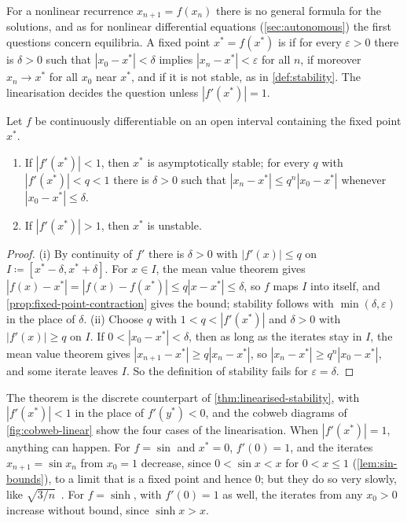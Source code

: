 For a nonlinear recurrence $x_{n+1}=f(x_n)$ there is no general formula for the solutions, and as for nonlinear differential equations (\cref{sec:autonomous}) the first questions concern equilibria. A fixed point $x^*=f(x^*)$ is  if for every $\varepsilon>0$ there is $\delta>0$ such that $|x_0-x^*|<\delta$ implies $|x_n-x^*|<\varepsilon$ for all $n$,  if moreover $x_n\to x^*$ for all $x_0$ near $x^*$, and  if it is not stable, as in \cref{def:stability}. The linearisation decides the question unless $|f'(x^*)|=1$.

\begin{theorem}
\label{thm:map-linearised}
Let $f$ be continuously differentiable on an open interval containing the fixed point $x^*$.
\begin{enumerate}
\item If $|f'(x^*)|<1$, then $x^*$ is asymptotically stable; for every $q$ with $|f'(x^*)|<q<1$ there is $\delta>0$ such that $|x_n-x^*|\le q^n|x_0-x^*|$ whenever $|x_0-x^*|\le\delta$.
\item If $|f'(x^*)|>1$, then $x^*$ is unstable.
\end{enumerate}
\end{theorem}

\begin{proof}
(i) By continuity of $f'$ there is $\delta>0$ with $|f'(x)|\le q$ on $I\coloneqq[x^*-\delta,x^*+\delta]$. For $x\in I$, the mean value theorem gives $|f(x)-x^*|=|f(x)-f(x^*)|\le q|x-x^*|\le\delta$, so $f$ maps $I$ into itself, and \cref{prop:fixed-point-contraction} gives the bound; stability follows with $\min(\delta,\varepsilon)$ in the place of $\delta$. (ii) Choose $q$ with $1<q<|f'(x^*)|$ and $\delta>0$ with $|f'(x)|\ge q$ on $I$. If $0<|x_0-x^*|<\delta$, then as long as the iterates stay in $I$, the mean value theorem gives $|x_{n+1}-x^*|\ge q|x_n-x^*|$, so $|x_n-x^*|\ge q^n|x_0-x^*|$, and some iterate leaves $I$. So the definition of stability fails for $\varepsilon=\delta$.
\end{proof}

The theorem is the discrete counterpart of \cref{thm:linearised-stability}, with $|f'(x^*)|<1$ in the place of $f'(y^*)<0$, and the cobweb diagrams of \cref{fig:cobweb-linear} show the four cases of the linearisation. When $|f'(x^*)|=1$, anything can happen. For $f=\sin$ and $x^*=0$, $f'(0)=1$, and the iterates $x_{n+1}=\sin x_n$ from $x_0=1$ decrease, since $0<\sin x<x$ for $0<x\le1$ (\cref{lem:sin-bounds}), to a limit that is a fixed point and hence $0$; but they do so very slowly, like $\sqrt{3/n}$~\cite[Chap.~8]{debruijn1981}. For $f=\sinh$, with $f'(0)=1$ as well, the iterates from any $x_0>0$ increase without bound, since $\sinh x>x$.

